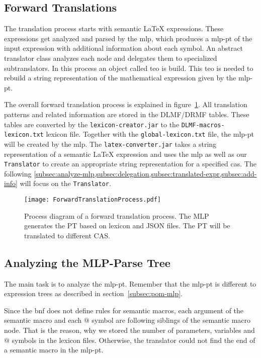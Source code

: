 \subsection{Forward Translations}\label{sec:forward-translation}
The translation process starts with semantic \LaTeX{} expressions. These expressions get analyzed and parsed by the \gls{mlp}, which produces a \gls{mlp-pt} of the input expression with additional information about each symbol. An abstract translator class analyzes each node and delegates them to specialized subtranslators. In this process an object called \gls{teo} is build. This \gls{teo} is needed to rebuild a string representation of the mathematical expression given by the \gls{mlp-pt}.

The overall forward translation process is explained in figure~\ref{fig:forward-trans}. All translation patterns and related information are stored in the DLMF/DRMF tables. These tables are converted by the \verb|lexicon-creator.jar| to the \verb|DLMF-macros-lexicon.txt| lexicon file. Together with the \verb|global-lexicon.txt| file, the \gls{mlp-pt} will be created by the \gls{mlp}. The \verb|latex-converter.jar| takes a string representation of a semantic \LaTeX{} expression and uses the \gls{mlp} as well as our \verb|Translator| to create an appropriate string representation for a specified \gls{cas}. The following \cref{subsec:analyze-mlp,subsec:delegation,subsec:translated-expr,subsec:add-info} will focus on the \verb|Translator|.

\begin{figure}[ht]
	\vspace{-10pt}
	\centering
	\texttt{[image: ForwardTranslationProcess.pdf]}
	\caption{Process diagram of a forward translation process. The MLP generates the PT based on lexicon and JSON files. The PT will be translated to different CAS.}
	\label{fig:forward-trans}
	\vspace{-10pt}
\end{figure}

\subsection{Analyzing the MLP-Parse Tree}\label{subsec:analyze-mlp}
The main task is to analyze the \gls{mlp-pt}. Remember that the \gls{mlp-pt} is different to expression trees as described in section~\ref{subsec:pom-mlp}.

Since the \gls{bnf} does not define rules for semantic macros, each argument of the semantic macro and each $@$ symbol are following siblings of the semantic macro node. That is the reason, why we stored the number of parameters, variables and $@$ symbols in the lexicon files. Otherwise, the translator could not find the end of a semantic macro in the \gls{mlp-pt}.

